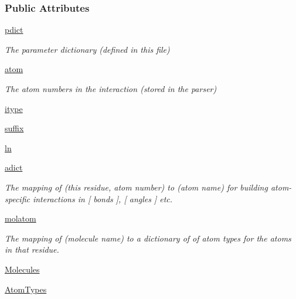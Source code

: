 \subsubsection*{\-Public \-Attributes}
\begin{DoxyCompactItemize}
\item 
\hyperlink{classforcebalance_1_1mol2io_1_1Mol2__Reader_a1948bbad4e6af3fc584838436f42daaf}{pdict}
\begin{DoxyCompactList}\small\item\em \-The parameter dictionary (defined in this file) \end{DoxyCompactList}\item 
\hyperlink{classforcebalance_1_1mol2io_1_1Mol2__Reader_a9e4c477cef5943566d43dfa67b918691}{atom}
\begin{DoxyCompactList}\small\item\em \-The atom numbers in the interaction (stored in the parser) \end{DoxyCompactList}\item 
\hyperlink{classforcebalance_1_1mol2io_1_1Mol2__Reader_a95aaa97b62b9854b5d8cf0861b09e330}{itype}
\item 
\hyperlink{classforcebalance_1_1mol2io_1_1Mol2__Reader_a39adb792b05aab536e3376ecf2ec5778}{suffix}
\item 
\hyperlink{classforcebalance_1_1BaseReader_a80c8e3bea212600742968aa8669e557b}{ln}
\item 
\hyperlink{classforcebalance_1_1BaseReader_a2c46ad6b66cf09a30e917ce4a1997e2a}{adict}
\begin{DoxyCompactList}\small\item\em \-The mapping of (this residue, atom number) to (atom name) for building atom-\/specific interactions in \mbox{[} bonds \mbox{]}, \mbox{[} angles \mbox{]} etc. \end{DoxyCompactList}\item 
\hyperlink{classforcebalance_1_1BaseReader_ab444c213e15929253dd73395ac5f19fc}{molatom}
\begin{DoxyCompactList}\small\item\em \-The mapping of (molecule name) to a dictionary of of atom types for the atoms in that residue. \end{DoxyCompactList}\item 
\hyperlink{classforcebalance_1_1BaseReader_a4369b5fb663a83b11602daa71db6862e}{\-Molecules}
\item 
\hyperlink{classforcebalance_1_1BaseReader_a69ca7d949a4a3df4d9f61e617fe0e270}{\-Atom\-Types}
\end{DoxyCompactItemize}


